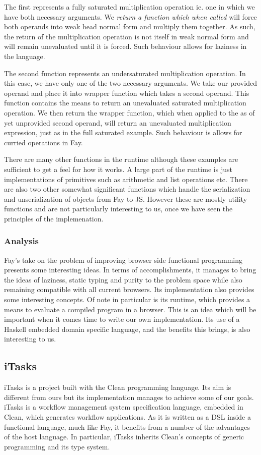 The first represents a fully saturated multiplication operation ie. one
in which we have both necessary arguments. We \emph{return a function
which when called} will force both operands into weak head normal form
and multiply them together. As such, the return of the multiplication
operation is not itself in weak normal form and will remain unevaluated
until it is forced. Such behaviour allows for laziness in the language.

The second function represents an undersaturated multiplication operation.
In this case, we have only one of the two necessary arguments. We take
our provided operand and place it into wrapper function which takes a second
operand. This function contains the means to return an unevaluated
saturated multiplication operation. We then return the wrapper function, 
which when applied to the as of yet unprovided second operand, will return
an unevaluated multiplication expression, just as in the full saturated example.
Such behaviour is allows for curried operations in Fay.

There are many other functions in the runtime although these examples
are sufficient to get a feel for how it works. A large part of the runtime
is just implementations of primitives such as arithmetic and list operations
etc. There are also two other somewhat significant functions which handle
the serialization and unserialization of objects from Fay to JS. However
these are mostly utility functions and are not particularly interesting
to us, once we have seen the principles of the implemenation.

\subsubsection{Analysis}
Fay's take on the problem of improving browser side functional programming
presents some interesting ideas. In terms of accomplishments, it manages
to bring the ideas of laziness, static typing and purity to the problem
space while also remaining compatible with all current browsers. Its
implementation also provides some interesting concepts. Of note in particular
is its runtime, which provides a means to evaluate a compiled program in a
browser. This is an idea which will be important when it comes time to write
our own implementation. Its use of a Haskell embedded domain specific 
language, and the benefits this brings, is also interesting to us.

\subsection{iTasks}
iTasks is a project built with the Clean programming language. Its aim
is different from ours but its implementation manages to achieve some of
our goals. iTasks is a workflow management system specification language,
embedded in Clean, which generates workflow applications. As it is written
as a DSL inside a functional language, much like Fay, it benefits from a
number of the advantages of the host language. In particular, iTasks inherits
Clean's concepts of generic programming and its type system.

